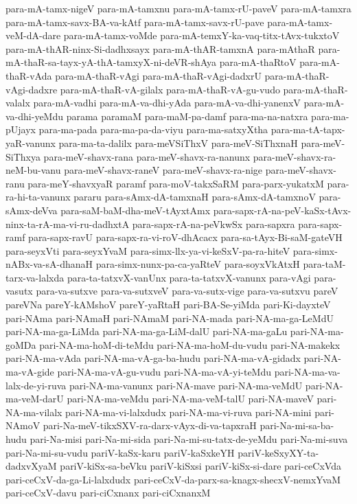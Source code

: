{para-mA-tamx-nigeV
para-mA-tamxnu
para-mA-tamx-rU-paveV
para-mA-tamxra
para-mA-tamx-savx-BA-va-kAtf
para-mA-tamx-savx-rU-pave
para-mA-tamx-veM-dA-dare
para-mA-tamx-voMde
para-mA-temxY-ka-vaq-titx-tAvx-tukxtoV
para-mA-thAR-ninx-Si-dadhxsayx
para-mA-thAR-tamxnA
para-mAthaR
para-mA-thaR-sa-tayx-yA-thA-tamxyX-ni-deVR-shAya
para-mA-thaRtoV
para-mA-thaR-vAda
para-mA-thaR-vAgi
para-mA-thaR-vAgi-dadxrU
para-mA-thaR-vAgi-dadxre
para-mA-thaR-vA-gilalx
para-mA-thaR-vA-gu-vudo
para-mA-thaR-valalx
para-mA-vadhi
para-mA-va-dhi-yAda
para-mA-va-dhi-yanenxV
para-mA-va-dhi-yeMdu
parama
paramaM
para-maM-pa-damf
para-ma-na-natxra
para-ma-pUjayx
para-ma-pada
para-ma-pa-da-viyu
para-ma-satxyXtha
para-ma-tA-tapx-yaR-vanunx
para-ma-ta-dalilx
para-meVSiThxV
para-meV-SiThxnaH
para-meV-SiThxya
para-meV-shavx-rana
para-meV-shavx-ra-nanunx
para-meV-shavx-ra-neM-bu-vanu
para-meV-shavx-raneV
para-meV-shavx-ra-nige
para-meV-shavx-ranu
para-meY-shavxyaR
paramf
para-moV-takxSaRM
para-parx-yukatxM
para-ra-hi-ta-vanunx
pararu
para-sAmx-dA-tamxnaH
para-sAmx-dA-tamxnoV
para-sAmx-deVva
para-saM-baM-dha-meV-tAyxtAmx
para-sapx-rA-na-peV-kaSx-tAvx-ninx-ta-rA-ma-vi-ru-dadhxtA
para-sapx-rA-na-peVkwSx
para-sapxra
para-sapx-ramf
para-sapx-ravU
para-sapx-ra-vi-roV-dhAcacx
para-sa-tAyx-Bi-saM-gateVH
para-seyxVti
para-seyxYvaM
para-simx-llx-ya-vi-keSxV-pa-ra-hiteV
para-simx-nABx-va-sA-dhanaH
para-simx-nunx-pa-ca-yaRteV
para-soyxVkAtxH
para-taM-tarx-va-lalxda
para-ta-tatxvX-vanUnx
para-ta-tatxvX-vanunx
para-vAgi
para-vasutx
para-va-sutxve
para-va-sutxveV
para-va-sutx-vige
para-va-sutxvu
pareV
pareVNa
pareY-kAMshoV
pareY-yaRtaH
pari-BA-Se-yiMda
pari-Ki-dayxteV
pari-NAma
pari-NAmaH
pari-NAmaM
pari-NA-mada
pari-NA-ma-ga-LeMdU
pari-NA-ma-ga-LiMda
pari-NA-ma-ga-LiM-dalU
pari-NA-ma-gaLu
pari-NA-ma-goMDa
pari-NA-ma-hoM-di-teMdu
pari-NA-ma-hoM-du-vudu
pari-NA-makekx
pari-NA-ma-vAda
pari-NA-ma-vA-ga-ba-hudu
pari-NA-ma-vA-gidadx
pari-NA-ma-vA-gide
pari-NA-ma-vA-gu-vudu
pari-NA-ma-vA-yi-teMdu
pari-NA-ma-va-lalx-de-yi-ruva
pari-NA-ma-vanunx
pari-NA-mave
pari-NA-ma-veMdU
pari-NA-ma-veM-darU
pari-NA-ma-veMdu
pari-NA-ma-veM-talU
pari-NA-maveV
pari-NA-ma-vilalx
pari-NA-ma-vi-lalxdudx
pari-NA-ma-vi-ruva
pari-NA-mini
pari-NAmoV
pari-Na-meV-tikxSXV-ra-darx-vAyx-di-va-tapxraH
pari-Na-mi-sa-ba-hudu
pari-Na-misi
pari-Na-mi-sida
pari-Na-mi-su-tatx-de-yeMdu
pari-Na-mi-suva
pari-Na-mi-su-vudu
pariV-kaSx-karu
pariV-kaSxkeYH
pariV-keSxyXY-ta-dadxvXyaM
pariV-kiSx-sa-beVku
pariV-kiSxsi
pariV-kiSx-si-dare
pari-ceCxVda
pari-ceCxV-da-ga-Li-lalxdudx
pari-ceCxV-da-parx-sa-knagx-shecxV-nemxYvaM
pari-ceCxV-davu
pari-ciCxnanx
pari-ciCxnanxM
}
